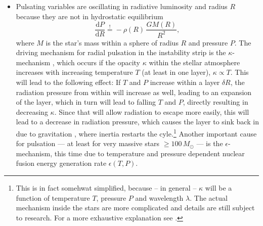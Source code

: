 \begin{itemize}
\item Pulsating variables are oscillating in radiative luminosity and radius $R$ because they are not in hydrostatic equilibrium
\begin{equation}
\label{eq:hydrostatic-equilibrium}
\frac{\mathrm{d}P}{\mathrm{d}R} \overset{!}= - \rho(R) \, \frac{G M(R)}{R^2},
\end{equation}
where $M$ is the star's mass within a sphere of radius $R$ and pressure $P$. The driving mechanism for radial pulsation in the instability strip is the $\kappa$-mechanism \citep{buchler1993}, which occurs if the opacity $\kappa$ within the stellar atmosphere increases with increasing temperature $T$ (at least in one layer), \ie $\kappa \propto T$. This will lead to the following effect: If $T$ and $P$ increase within a layer $\delta R$, the radiation pressure from within will increase as well, leading to an expansion of the layer, which in turn will lead to falling $T$ and $P$, directly resulting in decreasing $\kappa$. Since that will allow radiation to escape more easily, this will lead to a decrease in radiation pressure, which causes the layer to sink back in due to gravitation \citep{goodman2011}, where inertia restarts the cyle.\footnote{This is in fact somehwat simplified, because -- in general -- $\kappa$ will be a function of temperature $T$, pressure $P$ and wavelength $\lambda$. The actual mechanism inside the stars are more complicated and details are still subject to research. For a more exhaustive explanation see \citet{cox1980, percy2007}.} Another important cause for pulsation --- at least for very massive stars $\ge 100 \, \unit{M_\odot}$ \citep{buchler1993} --- is the $\epsilon$-mechanism, this time due to temperature and pressure dependent nuclear fusion energy generation rate $\epsilon(T, P)$.\\


\end{itemize}
